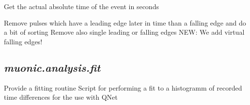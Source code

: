 \documentclass[letterpaper,10pt,english]{sphinxmanual}
\begin{document}
\begin{fulllineitems}
\begin{fulllineitems}
\end{fulllineitems}


\begin{fulllineitems}
\label{muonic:muonic.analysis.PulseAnalyzer.PulseExtractor.get_rel_time}
\end{fulllineitems}


\begin{fulllineitems}
\label{muonic:muonic.analysis.PulseAnalyzer.PulseExtractor.get_time}
Get the actual absolute time 
of the event in seconds

\end{fulllineitems}


\begin{fulllineitems}
\label{muonic:muonic.analysis.PulseAnalyzer.PulseExtractor.order_and_cleanpulses}
Remove pulses which have a 
leading edge later in time than a 
falling edge and do a bit of sorting
Remove also single leading or falling edges
NEW: We add virtual falling edges!

\end{fulllineitems}


\end{fulllineitems}



\subsection{\emph{muonic.analysis.fit}}
\label{muonic:muonic-analysis-fit}
Provide a fitting routine
\label{muonic:module-muonic.analysis.fit}
Script for performing a fit to a histogramm of recorded 
time differences for the use with QNet

\begin{fulllineitems}
\label{muonic:muonic.analysis.fit.main}
\end{fulllineitems}
\end{document}
